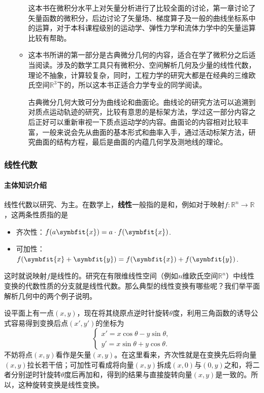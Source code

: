 \begin{itemize}
\begin{itemize}
                    这本书在微积分水平上对矢量分析进行了比较全面的讨论，第一章讨论了矢量函数的微积分，后边讨论了矢量场、梯度算子及一般的曲线坐标系中的运算，对于本科课程级别的运动学、弹性力学和流体力学中的矢量运算比较有帮助。

              \item \textcite[微分几何]{彭家贵2002微分几何}

                    这本书所讲的第一部分是古典微分几何的内容，适合在学了微积分之后适当阅读。涉及的数学工具只有微积分、空间解析几何及少量的线性代数，理论不抽象，计算较复杂，同时，工程力学的研究大都是在经典的三维欧氏空间$\mathbb{R}^3$下的，所以这本书正适合力学专业的同学阅读。

                    古典微分几何大致可分为曲线论和曲面论。曲线论的研究方法可以追溯到对质点运动轨迹的研究，比较有意思的是标架方法，学过这一部分内容之后正好可以重新审视一下质点运动学的内容。曲面论的内容相对比较丰富，一般来说会先从曲面的基本形式和曲率入手，通过活动标架方法，研究曲面的结构方程，最后是曲面的内蕴几何学及测地线的理论。
          \end{itemize}
\end{itemize}


\subsubsection{线性代数}

\paragraph{主体知识介绍}

线性代数以研究、为主。在数学上，\textbf{线性}一般指的是和，例如对于映射$f:\mathbb{R}^n\to\mathbb{R}$，这两条性质指的是

\begin{itemize}
    \item 齐次性：$f(a\symbfit{x})=a\cdot f(\symbfit{x})$.

    \item 可加性：$f(\symbfit{x}+\symbfit{y})=f(\symbfit{x})+ f(\symbfit{y})$.
\end{itemize}
这时就说映射$f$是线性的。研究在有限维线性空间（例如$n$维欧氏空间$\mathbb{R}^n$）中线性变换的代数性质的分支就是线性代数。那么典型的线性变换有哪些呢？我们举平面解析几何中的两个例子说明。

设平面上有一点$(x,y)$，现在将其绕原点逆时针旋转$\theta$度，利用三角函数的诱导公式容易得到变换后点$(x',y')$的坐标为
\[
    \begin{cases}
        x'=x\cos \theta -y\sin \theta, \\
        y'=x\sin \theta +y\cos \theta.
    \end{cases}
\]
不妨将点$(x,y)$看作是矢量$(x,y)$。在这里看来，齐次性就是在变换先后将向量$(x,y)$拉长若干倍；可加性可看成将向量$(x,y)$拆成$(x,0)$与$(0,y)$之和，将二者分别逆时针旋转$\theta$度后再加和，得到的结果与直接旋转向量$(x,y)$是一致的。所以，这种旋转变换是线性变换。


